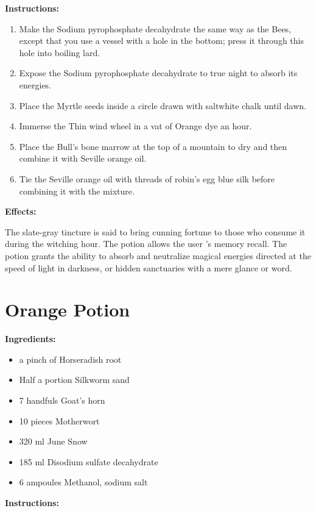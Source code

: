\documentclass{article}
\begin{document}
\textbf{Instructions:}

\begin{enumerate}
  \item Make the Sodium pyrophosphate decahydrate the same way as the Bees, except that you use a vessel with a hole in the bottom; press it through this hole into boiling lard.
  \item Expose the Sodium pyrophosphate decahydrate to true night to absorb its energies.
  \item Place the Myrtle seeds inside a circle drawn with saltwhite chalk until dawn.
  \item Immerse the Thin wind wheel in a vat of Orange dye an hour.
  \item Place the Bull's bone marrow at the top of a mountain to dry and then combine it with Seville orange oil.
  \item Tie the Seville orange oil with threads of robin's egg blue silk before combining it with the mixture.
\end{enumerate}

\textbf{Effects:}

The slate-gray tincture is said to bring cunning fortune to those who consume it during the witching hour. The potion allows the user 's memory recall. The potion grants the ability to absorb and neutralize magical energies directed at the speed of light in darkness, or hidden sanctuaries with a mere glance or word.

\newpage
\section*{Orange Potion}

\textbf{Ingredients:}

\begin{itemize}
  \item a pinch of Horseradish root
  \item Half a portion Silkworm sand
  \item 7 handfuls Goat's horn
  \item 10 pieces Motherwort
  \item 320 ml June Snow
  \item 185 ml Disodium sulfate decahydrate
  \item 6 ampoules Methanol, sodium salt
\end{itemize}

\textbf{Instructions:}
\end{document}
